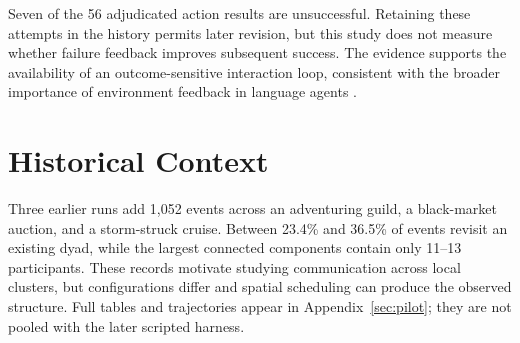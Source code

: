 Seven of the 56 adjudicated action results are unsuccessful. Retaining these
attempts in the history permits later revision, but this study does not measure
whether failure feedback improves subsequent success. The evidence supports
the availability of an outcome-sensitive interaction loop, consistent with
the broader importance of environment feedback in language agents
\cite{react,reflexion,voyager}.



\section{Historical Context}
Three earlier runs add 1,052 events across an adventuring guild, a black-market
auction, and a storm-struck cruise. Between 23.4\% and 36.5\% of events revisit
an existing dyad, while the largest connected components contain only 11--13
participants. These records motivate studying communication across local
clusters, but configurations differ and spatial scheduling can produce the
observed structure. Full tables and trajectories appear in
Appendix~\ref{sec:pilot}; they are not pooled with the later scripted harness.

